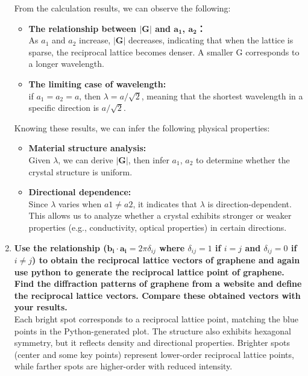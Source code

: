 \documentclass[12pt,a4paper]{article}
\begin{document}
\begin{CJK}{UTF8}{bkai}
\begin{enumerate}
    From the calculation results, we can observe the following:
    \begin{itemize}
        \item \textbf{The relationship between $|\mathbf{G}|$ and $\mathbf{a_1}$, $\mathbf{a_2}$：}\\
        As $a_1$ and $a_2$ increase, $|\mathbf{G}|$ decreases, indicating that when the lattice is sparse, the reciprocal lattice becomes denser. A smaller G corresponds to a longer wavelength.
        \item \textbf{The limiting case of wavelength:}\\
        if $a_1=a_2=a$, then $\lambda=a/\sqrt{2}$, meaning that the shortest wavelength in a specific direction is $a/\sqrt{2}$.
    \end{itemize}
    Knowing these results, we can infer the following physical properties:
    \begin{itemize}
        \item \textbf{Material structure analysis:}\\
        Given $\lambda$, we can derive $|\mathbf{G}|$, then infer $a_1$, $a_2$ to determine whether the crystal structure is uniform.
        \item \textbf{Directional dependence:}\\
        Since $\lambda$ varies when $a1\neq a2$, it indicates that $\lambda$ is direction-dependent. This allows us to analyze whether a crystal exhibits stronger or weaker properties (e.g., conductivity, optical properties) in certain directions.
    \end{itemize}
    \item \textbf{Use the relationship ($\mathbf{b_i \cdot a_i} =2\pi \delta_{ij}$ where $\delta_{ij}=1$ if $i=j$ and $\delta_{ij}=0$ if $i\neq j$) to obtain the reciprocal lattice vectors of graphene and again use python to generate the reciprocal lattice point of graphene. Find the diffraction patterns of graphene from a website and define the reciprocal lattice vectors. Compare these obtained vectors with your results.}\\
    Each bright spot corresponds to a reciprocal lattice point, matching the blue points in the Python-generated plot. The structure also exhibits hexagonal symmetry, but it reflects density and directional properties. Brighter spots (center and some key points) represent lower-order reciprocal lattice points, while farther spots are higher-order with reduced intensity.



\end{enumerate}
\end{CJK}
\end{document}
